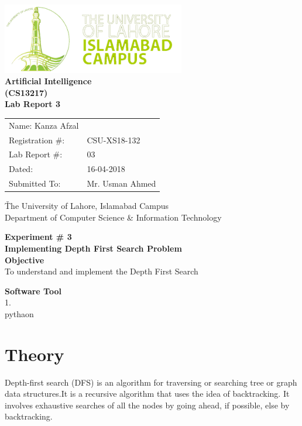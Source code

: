\documentclass[11pt]{article}            %
\begin{document}
\begin{titlepage}
    \centering
  \vfill
    \includegraphics[width=8cm]{uni_logo.png} \\ 
	\vskip2cm
    {\bfseries\Large
	Artificial Intelligence \\ (CS13217)\\
	
	\vskip2cm
	Lab Report 3
	\vskip2cm
	}    

\begin{center}
\begin{tabular}{ l l  } 

Name: Kanza Afzal \\ 
Registration \#: & CSU-XS18-132 \\ 
Lab Report \#: & 03 \\ 
 Dated:& 16-04-2018\\ 
Submitted To:& Mr. Usman Ahmed\\ 

\end{tabular}
\end{center}
    \v
    The University of Lahore, Islamabad Campus\\
Department of Computer Science \& Information Technology
\end{titlepage}


    
    {\bfseries\Large
\centering
	Experiment \# 3 \\

Implementing Depth First  Search Problem\\
	
	}    
 \vskip1cm
 \textbf {Objective}\\  To understand and implement the Depth First Search
 
 \textbf {Software Tool} \\
1.  \\pythaon

\section{Theory }              
Depth-first search (DFS) is an algorithm for traversing or searching tree or graph data structures.It is a recursive algorithm that uses the idea of backtracking. It involves exhaustive searches of all the nodes by going ahead, if possible, else by backtracking.
\end{document}
